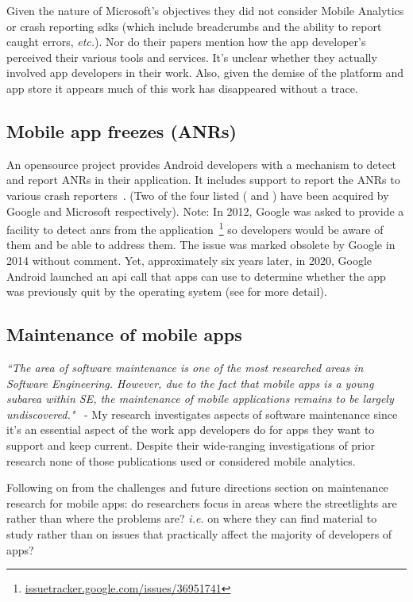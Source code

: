 Given the nature of Microsoft's objectives they did not consider Mobile Analytics or crash reporting \Glspl{sdk} 
(which include breadcrumbs and the ability to report caught errors, \emph{etc.}). Nor do their papers mention how the app developer's perceived their various tools and services. It's unclear whether they actually involved app developers in their work. Also, given the demise of the  platform and app store it appears much of this work has disappeared without a trace.


\subsection{Mobile app freezes (ANRs)}
An opensource project provides Android developers with a mechanism to detect and report ANRs in their application. It includes support to report the ANRs to various crash reporters~\cite{salomonbrys_github_anr_watchdog}. (Two of the four listed ( and ) have been acquired by Google and Microsoft respectively). Note: In 2012, Google was asked to provide a facility to detect \Glspl{anr} 
from the application~\footnote{\href{https://issuetracker.google.com/issues/36951741}{issuetracker.google.com/issues/36951741}} so developers would be aware of them and be able to address them. The issue was marked obsolete by Google in 2014 without comment. Yet, approximately six years later, in 2020, Google Android launched an \Gls{api} 
call that apps can use to determine whether the app was previously quit by the operating system (see  for more detail). 


\subsection{Maintenance of mobile apps}
\emph{``The area of software maintenance is one of the most researched areas in Software Engineering. However, due to the fact that mobile apps is a young subarea within SE, the maintenance of mobile applications remains to be largely undiscovered."}~\cite[p. 27]{nagappan2016_future_trends_in_sw_eng_for_mobile_apps} - My research investigates aspects of software maintenance since it's an essential aspect of the work app developers do for apps they want to support and keep current. Despite their wide-ranging investigations of prior research none of those publications used or considered mobile analytics. 

Following on from the challenges and future directions section on maintenance research for mobile apps: do researchers focus in areas where the streetlights are rather than where the problems are? \emph{i.e.} on where they can find material to study rather than on issues that practically affect the majority of developers of apps?


